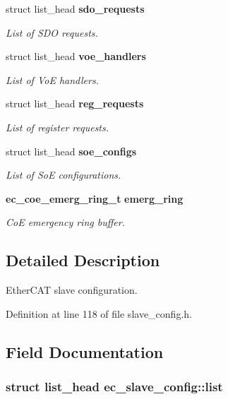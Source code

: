 \begin{DoxyCompactItemize}
struct list\-\_\-head {\bf sdo\-\_\-requests}
\begin{DoxyCompactList}\small\item\em \-List of \-S\-D\-O requests. \end{DoxyCompactList}\item 
struct list\-\_\-head {\bf voe\-\_\-handlers}
\begin{DoxyCompactList}\small\item\em \-List of \-Vo\-E handlers. \end{DoxyCompactList}\item 
struct list\-\_\-head {\bf reg\-\_\-requests}
\begin{DoxyCompactList}\small\item\em \-List of register requests. \end{DoxyCompactList}\item 
struct list\-\_\-head {\bf soe\-\_\-configs}
\begin{DoxyCompactList}\small\item\em \-List of \-So\-E configurations. \end{DoxyCompactList}\item 
{\bf ec\-\_\-coe\-\_\-emerg\-\_\-ring\-\_\-t} {\bf emerg\-\_\-ring}
\begin{DoxyCompactList}\small\item\em \-Co\-E emergency ring buffer. \end{DoxyCompactList}\end{DoxyCompactItemize}


\subsection{\-Detailed \-Description}
\-Ether\-C\-A\-T slave configuration. 

\-Definition at line 118 of file slave\-\_\-config.\-h.



\subsection{\-Field \-Documentation}
\subsubsection[{list}]{\setlength{\rightskip}{0pt plus 5cm}struct list\-\_\-head {\bf ec\-\_\-slave\-\_\-config\-::list}}\label{structec__slave__config_a52b1f382ad8f4272ece7870347dc9118}


